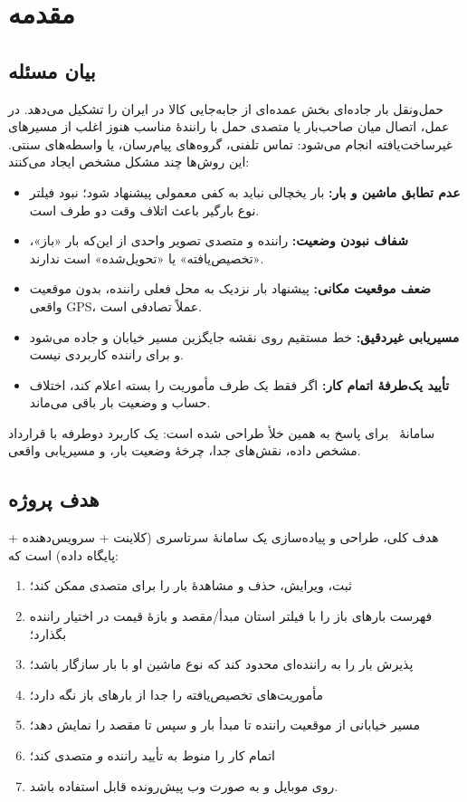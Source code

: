 \chapter[مقدمه]{مقدمه}

\section{بیان مسئله}

حمل‌ونقل بار جاده‌ای بخش عمده‌ای از جابه‌جایی کالا در ایران را تشکیل می‌دهد. در عمل، اتصال میان صاحب‌بار یا متصدی حمل با رانندهٔ مناسب هنوز اغلب از مسیرهای غیرساخت‌یافته انجام می‌شود: تماس تلفنی، گروه‌های پیام‌رسان، یا واسطه‌های سنتی. این روش‌ها چند مشکل مشخص ایجاد می‌کنند:

\begin{itemize}
  \item \textbf{عدم تطابق ماشین و بار:} بار یخچالی نباید به کفی معمولی پیشنهاد شود؛ نبود فیلتر نوع بارگیر باعث اتلاف وقت دو طرف است.
  \item \textbf{شفاف نبودن وضعیت:} راننده و متصدی تصویر واحدی از این‌که بار «باز»، «تخصیص‌یافته» یا «تحویل‌شده» است ندارند.
  \item \textbf{ضعف موقعیت مکانی:} پیشنهاد بار نزدیک به محل فعلی راننده، بدون موقعیت واقعی \textenglish{GPS}، عملاً تصادفی است.
  \item \textbf{مسیریابی غیردقیق:} خط مستقیم روی نقشه جایگزین مسیر خیابان و جاده می‌شود و برای راننده کاربردی نیست.
  \item \textbf{تأیید یک‌طرفهٔ اتمام کار:} اگر فقط یک طرف مأموریت را بسته اعلام کند، اختلاف حساب و وضعیت بار باقی می‌ماند.
\end{itemize}

سامانهٔ \appname\ برای پاسخ به همین خلأ طراحی شده است: یک کاربرد دوطرفه با قرارداد مشخص داده، نقش‌های جدا، چرخهٔ وضعیت بار، و مسیریابی واقعی.

\section{هدف پروژه}

هدف کلی، طراحی و پیاده‌سازی یک سامانهٔ سرتاسری (کلاینت + سرویس‌دهنده + پایگاه داده) است که:

\begin{enumerate}
  \item ثبت، ویرایش، حذف و مشاهدهٔ بار را برای متصدی ممکن کند؛
  \item فهرست بارهای باز را با فیلتر استان مبدأ/مقصد و بازهٔ قیمت در اختیار راننده بگذارد؛
  \item پذیرش بار را به راننده‌ای محدود کند که نوع ماشین او با بار سازگار باشد؛
  \item مأموریت‌های تخصیص‌یافته را جدا از بارهای باز نگه دارد؛
  \item مسیر خیابانی از موقعیت راننده تا مبدأ بار و سپس تا مقصد را نمایش دهد؛
  \item اتمام کار را منوط به تأیید راننده \emph{و} متصدی کند؛
  \item روی موبایل و به صورت وب پیش‌رونده قابل استفاده باشد.
\end{enumerate}

